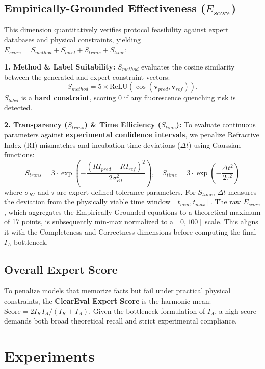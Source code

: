 \documentclass[runningheads]{llncs}
\begin{document}
\subsection{Empirically-Grounded Effectiveness ($E_{score}$)}
This dimension quantitatively verifies protocol feasibility against expert databases and physical constraints, yielding $E_{score} = S_{method} + S_{label} + S_{trans} + S_{time}$:

\noindent\textbf{1. Method \& Label Suitability:} 
$S_{method}$ evaluates the cosine similarity between the generated and expert constraint vectors: 
\begin{equation}
S_{method} = 5 \times \text{ReLU}(\cos(\mathbf{v}_{pred}, \mathbf{v}_{ref})). 
\end{equation}
$S_{label}$ is a \textbf{hard constraint}, scoring 0 if any fluorescence quenching risk is detected.

\noindent\textbf{2. Transparency ($S_{trans}$) \& Time Efficiency ($S_{time}$):} 
To evaluate continuous parameters against \textbf{experimental confidence intervals}, we penalize Refractive Index (RI) mismatches and incubation time deviations ($\Delta t$) using Gaussian functions:
\begin{equation}
S_{trans} = 3 \cdot \exp \left( - \frac{(RI_{pred} - RI_{ref})^2}{2\sigma_{RI}^2} \right), \quad
S_{time} = 3 \cdot \exp \left( - \frac{\Delta t^2}{2\tau^2} \right)
\end{equation}
where $\sigma_{RI}$ and $\tau$ are expert-defined tolerance parameters. For $S_{time}$, $\Delta t$ measures the deviation from the physically viable time window $[t_{min}, t_{max}]$.
The raw $E_{score}$, which aggregates the Empirically-Grounded equations to a theoretical maximum of 17 points, is subsequently min-max normalized to a $[0, 100]$ scale. This aligns it with the Completeness and Correctness dimensions before computing the final $I_A$ bottleneck.

\subsection{Overall Expert Score}
To penalize models that memorize facts but fail under practical physical constraints, the \textbf{ClearEval Expert Score} is the harmonic mean: $\text{Score} = 2 I_K I_A / (I_K + I_A)$. Given the bottleneck formulation of $I_A$, a high score demands both broad theoretical recall and strict experimental compliance.

\section{Experiments}
\end{document}
